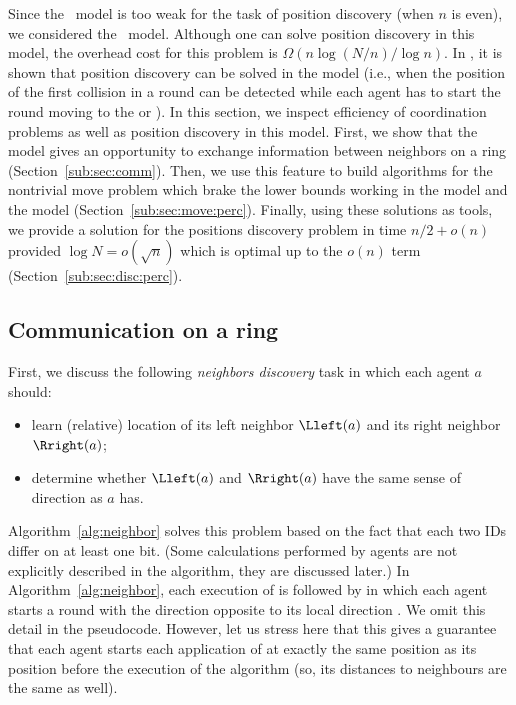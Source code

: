 Since the \basic\ model is too weak for the task of position discovery (when $n$ is even),
we considered the \lazy\ model. Although one can solve position discovery in this model, the
overhead cost for this problem is $\Omega(n\log(N/n)/\log n)$.
In \cite{FriedetzkyGGM12}, it is shown that position discovery
can be solved in the {\perceptive} model (i.e., when the position
of the first collision in a round can be detected while each
agent has to start the round moving to the {\rright} or {\lleft}).
In this section, we inspect efficiency of coordination problems as well as position discovery in this model.
First, we show that the {\perceptive} model gives an opportunity to exchange information between neighbors
on a ring (Section~\ref{sub:sec:comm}). Then, we use this feature to build algorithms for the nontrivial move problem 
which brake the lower bounds working in the {\basic} model and the {\lazy} model (Section~\ref{sub:sec:move:perc}).
Finally, using these solutions as tools, we provide a solution for the positions discovery problem
in time $n/2+o(n)$ provided $\log N=o(\sqrt{n})$ which is optimal up to the $o(n)$ term (Section~\ref{sub:sec:disc:perc}).

\subsection{Communication on a ring}
First, we discuss the following {\em neighbors discovery} task in which
each agent $a$ should:
\begin{itemize}
\item
\vspace{-5pt}
learn (relative) location of its left neighbor $\Lleft(a)$ and its right neighbor $\Rright(a)$;
\item
\vspace{-5pt}
determine whether $\Lleft(a)$ and $\Rright(a)$ have the same sense of direction as $a$ has.
\end{itemize}
\vspace{-5pt}
Algorithm~\ref{alg:neighbor} solves this problem based on the fact that each two
IDs differ on at least one bit. (Some calculations performed by agents are not
explicitly described in the algorithm, they are discussed later.)
In Algorithm~\ref{alg:neighbor}, each execution of {\SingleRound} is followed by {\ReversedRound} in which
each agent starts a round with the direction opposite to its local direction {\dir}. We omit this detail in the pseudocode. However, let us stress here that this gives a guarantee that each agent starts each application of {\SingleRound} at exactly the same position as its position before the execution of the
algorithm (so, its distances to neighbours are the same as well). 

